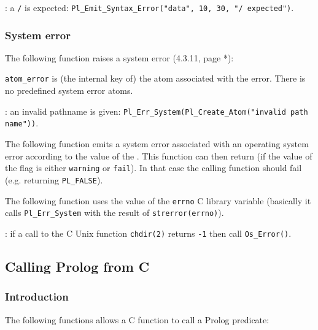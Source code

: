 
: a \texttt{/} is expected:
\texttt{Pl\_Emit\_Syntax\_Error("data", 10, 30, "/ expected")}.

\subsubsection{System error}
The following function raises a system error (4.3.11, page *):


\texttt{atom\_error} is (the internal key of) the atom associated with the
error. There is no predefined system error atoms.

: an invalid pathname is given:
\texttt{Pl\_Err\_System(Pl\_Create\_Atom("invalid path name"))}.

The following function emits a system error associated with an operating
system error according to the value of the   . This function can then return (if the
value of the flag is either \texttt{warning} or \texttt{fail}). In that case
the calling function should fail (e.g. returning \texttt{PL\_FALSE}).

The following function uses the value of the \texttt{errno} C library
variable (basically it calls \texttt{Pl\_Err\_System} with the result
of \texttt{strerror(errno)}).


: if a call to the C Unix function \texttt{chdir(2)} returns
\texttt{-1} then call \texttt{Os\_Error()}.


\subsection{Calling Prolog from C}

\subsubsection{Introduction}
The following functions allows a C function to call a Prolog predicate:

